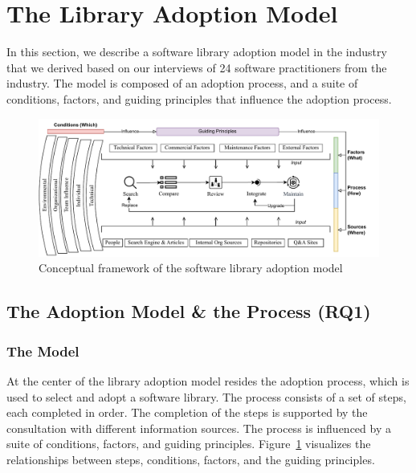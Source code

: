 \section{The Library Adoption Model}
In this section, we describe a software library adoption model in the industry that we derived based on our interviews of 24 software practitioners from the industry. The model is composed of an adoption process, and a suite of conditions, factors, and guiding principles that influence the adoption process. 
\begin{figure}
    \centering
    \includegraphics[scale=0.8  ]{images/Library-adoption-framework.v3.pdf}
    \caption{Conceptual framework of the software library adoption model}
    \label{fig:framework}
\end{figure}
\subsection{The Adoption Model \& the Process (RQ1)}\label{sec:rq1}
\subsubsection{The Model}\label{sec:framework}
At the center of the library adoption model resides the adoption process, which is used to select and adopt a software library. The process consists of a set of steps, each completed in order. The completion of the steps is supported by the consultation with different information sources. The process is influenced by a suite of conditions, factors, and guiding principles. Figure~\ref{fig:framework} visualizes the relationships between steps, conditions, factors, and the guiding principles. 



